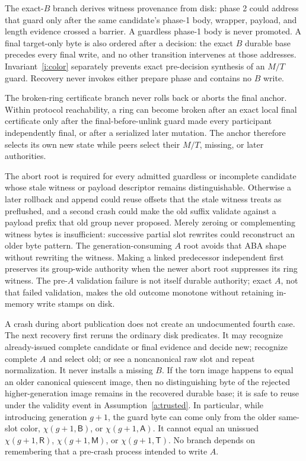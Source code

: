\documentclass[10pt,twocolumn]{article}
\theoremstyle{remark}
\newcommand{\Root}{\mathsf{R}}
\newcommand{\Prepared}{\mathsf{B}}
\newcommand{\Materialized}{\mathsf{M}}
\newcommand{\Tombstone}{\mathsf{T}}
\newcommand{\Abort}{\mathsf{A}}
\begin{document}
The exact-$B$ branch derives witness provenance from disk: phase 2 could address that guard only
after the same candidate's phase-1 body, wrapper, payload, and length evidence crossed a barrier.
A guardless phase-1 body is never promoted. A final target-only byte is also ordered after a
decision: the exact $B$ durable base precedes every final write, and no other transition intervenes
at those addresses. Invariant~\ref{i:color} separately prevents exact pre-decision synthesis of an
$M/T$ guard. Recovery never invokes either prepare phase and contains no $B$ write.

The broken-ring certificate branch never rolls back or aborts the final anchor. Within protocol
reachability, a ring can become broken after an exact local final certificate only after the
final-before-unlink guard made every participant independently final, or after a serialized later
mutation. The anchor therefore selects its own new state while peers select their $M/T$, missing,
or later authorities.

The abort root is required for every admitted guardless or incomplete candidate whose stale witness
or payload descriptor remains distinguishable. Otherwise a later rollback and append could reuse
offsets that the stale witness treats as preflushed, and a
second crash could make the old suffix validate against a payload prefix that old group never
proposed. Merely zeroing or complementing witness bytes is insufficient: successive partial slot
rewrites could reconstruct an older byte pattern. The generation-consuming $A$ root avoids that
ABA shape without rewriting the witness. Making a linked predecessor independent first preserves
its group-wide authority when the newer abort root suppresses its ring witness. The pre-$A$
validation failure is not itself durable authority; exact $A$, not that failed validation, makes
the old outcome monotone without retaining in-memory write stamps on disk.

A crash during abort publication does not create an undocumented fourth case. The next recovery
first reruns the ordinary disk predicates. It may recognize already-issued complete candidate or
final evidence and decide new; recognize complete $A$ and select old; or see a noncanonical raw
slot and repeat normalization. It never installs a missing $B$. If the torn image happens to equal an older canonical
quiescent image,
then no distinguishing byte of the rejected higher-generation image remains in the recovered
durable base; it is safe to reuse under the validity event in Assumption~\ref{a:trusted}. In
particular, while introducing generation $g+1$, the guard byte can come only from the older
same-slot color, $\chi(g+1,\Prepared)$, or $\chi(g+1,\Abort)$. It cannot equal an unissued
$\chi(g+1,\Root)$, $\chi(g+1,\Materialized)$, or $\chi(g+1,\Tombstone)$. No branch depends on
remembering that a pre-crash process intended to write $A$.
\end{document}
